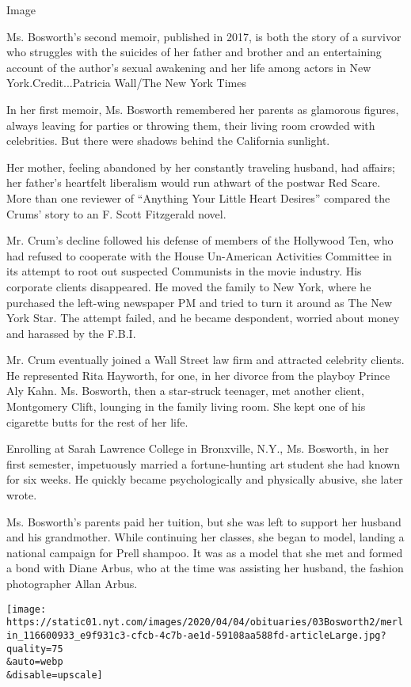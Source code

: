 Image

Ms. Bosworth's second memoir, published in 2017, is both the story of a
survivor who struggles with the suicides of her father and brother and
an entertaining account of the author's sexual awakening and her life
among actors in New York.Credit...Patricia Wall/The New York Times

In her first memoir, Ms. Bosworth remembered her parents as glamorous
figures, always leaving for parties or throwing them, their living room
crowded with celebrities. But there were shadows behind the California
sunlight.

Her mother, feeling abandoned by her constantly traveling husband, had
affairs; her father's heartfelt liberalism would run athwart of the
postwar Red Scare. More than one reviewer of ``Anything Your Little
Heart Desires'' compared the Crums' story to an F. Scott Fitzgerald
novel.

Mr. Crum's decline followed his defense of members of the Hollywood Ten,
who had refused to cooperate with the House Un-American Activities
Committee in its attempt to root out suspected Communists in the movie
industry. His corporate clients disappeared. He moved the family to New
York, where he purchased the left-wing newspaper PM and tried to turn it
around as The New York Star. The attempt failed, and he became
despondent, worried about money and harassed by the F.B.I.

Mr. Crum eventually joined a Wall Street law firm and attracted
celebrity clients. He represented Rita Hayworth, for one, in her divorce
from the playboy Prince Aly Kahn. Ms. Bosworth, then a star-struck
teenager, met another client, Montgomery Clift, lounging in the family
living room. She kept one of his cigarette butts for the rest of her
life.

Enrolling at Sarah Lawrence College in Bronxville, N.Y., Ms. Bosworth,
in her first semester, impetuously married a fortune-hunting art student
she had known for six weeks. He quickly became psychologically and
physically abusive, she later wrote.

Ms. Bosworth's parents paid her tuition, but she was left to support her
husband and his grandmother. While continuing her classes, she began to
model, landing a national campaign for Prell shampoo. It was as a model
that she met and formed a bond with Diane Arbus, who at the time was
assisting her husband, the fashion photographer Allan Arbus.

\texttt{[image: https://static01.nyt.com/images/2020/04/04/obituaries/03Bosworth2/merlin\_116600933\_e9f931c3-cfcb-4c7b-ae1d-59108aa588fd-articleLarge.jpg?quality=75\\\&auto=webp\\\&disable=upscale]}

